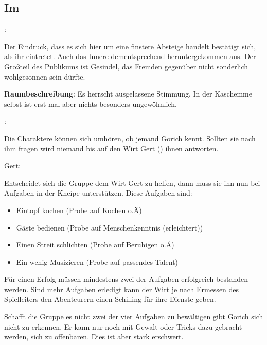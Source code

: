 \subsection{Im }
\label{imhund}

:

Der Eindruck, dass es sich hier um eine finstere Absteige handelt bestätigt sich, als ihr eintretet. Auch das Innere dementsprechend heruntergekommen aus. Der Großteil des Publikums ist Gesindel, das Fremden gegenüber nicht sonderlich wohlgesonnen sein dürfte.

\textbf{Raumbeschreibung}: Es herrscht ausgelassene Stimmung. In der Kaschemme selbst ist erst mal aber nichts besonders ungewöhnlich.

:

Die Charaktere können sich umhören, ob jemand Gorich kennt. Sollten sie nach ihm fragen wird niemand bis auf den Wirt Gert (\blue{\ref{Gert}}) ihnen antworten.

Gert: 

Entscheidet sich die Gruppe dem Wirt Gert zu helfen, dann muss sie ihn nun bei Aufgaben in der Kneipe unterstützen. Diese Aufgaben sind:

\begin{itemize}
  \item Eintopf kochen (Probe auf Kochen o.Ä)
  \item Gäste bedienen (Probe auf Menschenkenntnis (erleichtert))
  \item Einen Streit schlichten (Probe auf Beruhigen o.Ä)
  \item Ein wenig Musizieren (Probe auf passendes Talent)
\end{itemize}

Für einen Erfolg müssen mindestens zwei der Aufgaben erfolgreich bestanden werden. Sind mehr Aufgaben erledigt kann der Wirt je nach Ermessen des Spielleiters den Abenteurern einen Schilling für ihre Dienste geben.

Schafft die Gruppe es nicht zwei der vier Aufgaben zu bewältigen gibt Gorich sich nicht zu erkennen. Er kann nur noch mit Gewalt oder Tricks dazu gebracht werden, sich zu offenbaren. Dies ist aber stark erschwert.

